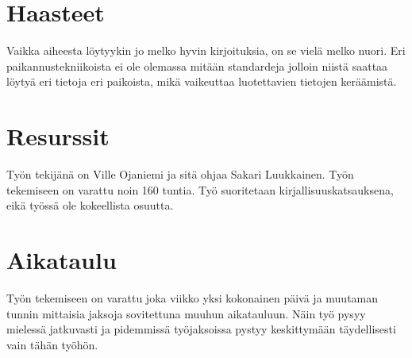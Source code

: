 \documentclass[12pt,a4paper,finnish,oneside]{article}
\begin{document}



\section{Haasteet}

Vaikka aiheesta löytyykin jo melko hyvin kirjoituksia, on se vielä melko nuori. Eri paikannustekniikoista ei ole olemassa mitään standardeja jolloin niistä saattaa löytyä eri tietoja eri paikoista, mikä vaikeuttaa luotettavien tietojen keräämistä. 

\section{Resurssit}

Työn tekijänä on Ville Ojaniemi ja sitä ohjaa Sakari Luukkainen. Työn tekemiseen on varattu noin 160 tuntia. Työ suoritetaan kirjallisuuskatsauksena, eikä työssä ole kokeellista osuutta.

\section{Aikataulu}

Työn tekemiseen on varattu joka viikko yksi kokonainen päivä ja muutaman tunnin mittaisia jaksoja sovitettuna muuhun aikatauluun. Näin työ pysyy mielessä jatkuvasti ja pidemmissä työjaksoissa pystyy keskittymään täydellisesti vain tähän työhön. 
\end{document}
